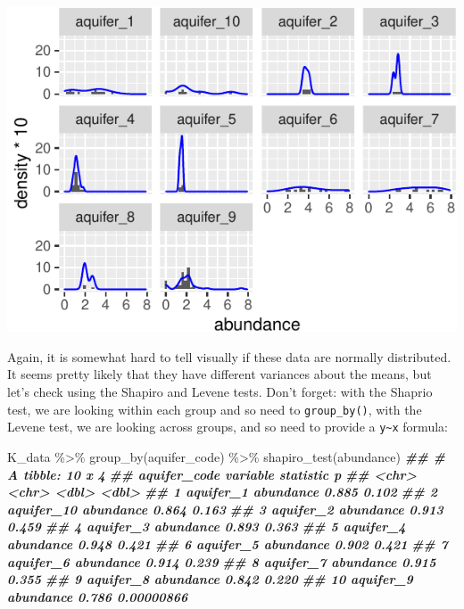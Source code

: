 \documentclass[
]{krantz}
\newenvironment{Shaded}{\begin{snugshade}}{\end{snugshade}}
\newcommand{\DocumentationTok}[1]{\textcolor[rgb]{0.56,0.35,0.01}{\textbf{\textit{#1}}}}
\newcommand{\FunctionTok}[1]{\textcolor[rgb]{0.00,0.00,0.00}{#1}}
\newcommand{\NormalTok}[1]{#1}
\newcommand{\SpecialCharTok}[1]{\textcolor[rgb]{0.00,0.00,0.00}{#1}}
\begin{document}
\begin{center}\includegraphics[width=1\linewidth]{index_files/figure-latex/unnamed-chunk-146-1} \end{center}

Again, it is somewhat hard to tell visually if these data are normally distributed. It seems pretty likely that they have different variances about the means, but let's check using the Shapiro and Levene tests. Don't forget: with the Shaprio test, we are looking within each group and so need to \texttt{group\_by()}, with the Levene test, we are looking across groups, and so need to provide a \texttt{y\textasciitilde{}x} formula:

\begin{Shaded}
\begin{Highlighting}[]
\NormalTok{K\_data }\SpecialCharTok{\%\textgreater{}\%}
  \FunctionTok{group\_by}\NormalTok{(aquifer\_code) }\SpecialCharTok{\%\textgreater{}\%} 
  \FunctionTok{shapiro\_test}\NormalTok{(abundance)}
\DocumentationTok{\#\# \# A tibble: 10 x 4}
\DocumentationTok{\#\#    aquifer\_code variable  statistic          p}
\DocumentationTok{\#\#    \textless{}chr\textgreater{}        \textless{}chr\textgreater{}         \textless{}dbl\textgreater{}      \textless{}dbl\textgreater{}}
\DocumentationTok{\#\#  1 aquifer\_1    abundance     0.885 0.102     }
\DocumentationTok{\#\#  2 aquifer\_10   abundance     0.864 0.163     }
\DocumentationTok{\#\#  3 aquifer\_2    abundance     0.913 0.459     }
\DocumentationTok{\#\#  4 aquifer\_3    abundance     0.893 0.363     }
\DocumentationTok{\#\#  5 aquifer\_4    abundance     0.948 0.421     }
\DocumentationTok{\#\#  6 aquifer\_5    abundance     0.902 0.421     }
\DocumentationTok{\#\#  7 aquifer\_6    abundance     0.914 0.239     }
\DocumentationTok{\#\#  8 aquifer\_7    abundance     0.915 0.355     }
\DocumentationTok{\#\#  9 aquifer\_8    abundance     0.842 0.220     }
\DocumentationTok{\#\# 10 aquifer\_9    abundance     0.786 0.00000866}
\end{Highlighting}
\end{Shaded}
\end{document}
